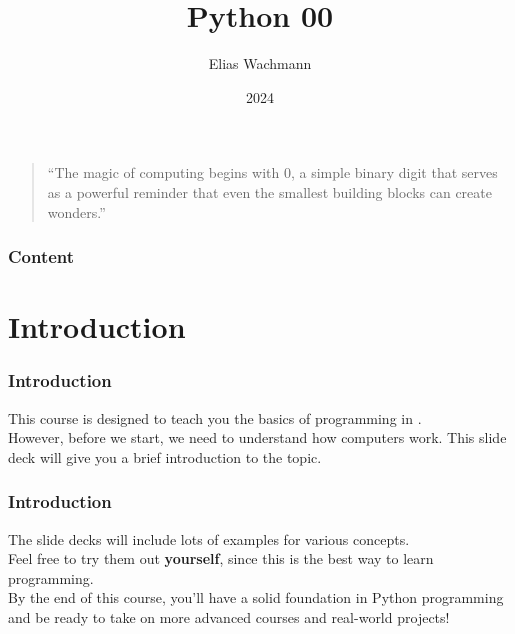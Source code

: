 \documentclass{beamer}
\title[]
{Python 00}
\author[E.~Wachmann]{\scriptsize Elias Wachmann
}
\date{2024} %
\institute[Institute of Theoretical and Computational Physics]
{
}
\begin{document}
\titleframe


\begin{frame}
  \vspace*{\fill}
  \begin{center}
    \begin{quote}
        ``The magic of computing begins with 0, a simple binary digit that serves as a powerful reminder that even the smallest building blocks can create wonders.''
    \end{quote}
\end{center}
\vspace*{\fill}
\end{frame}

\begin{frame}
\frametitle{Content}
  \tableofcontents
\end{frame}

\label{sec:intro}
\section{Introduction}
\begin{frame}
  \frametitle{Introduction}
  This course is designed to teach you the basics of programming in .\\
  \vspace{0.5cm}
  However, before we start, we need to understand how computers work. This slide deck will give you a brief introduction to the topic. 
\end{frame}
\begin{frame}
  \frametitle{Introduction}
  The slide decks will include lots of examples for various concepts. \\
  Feel free to try them out \textbf{yourself}, since this is the best way to learn programming.\\
  \vspace{0.5cm}
  By the end of this course, you'll have a solid foundation in Python programming and be ready to take on more advanced courses and real-world projects!
\end{frame}
\label{sec:binary_numbers}
\end{document}
